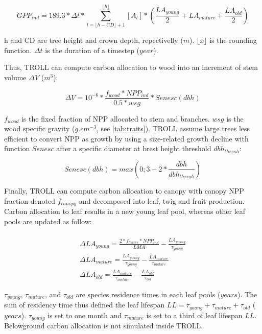 \documentclass[12pt,]{article}
\theoremstyle{definition}
\theoremstyle{definition}
\theoremstyle{remark}
\begin{document}
\begin{equation}
  GPP_{ind} = 189.3 * \Delta t * \sum _{l= \lfloor h-CD \rfloor +1} ^{\lfloor h \rfloor} [A_l] * (\frac{LA_{young}}{2} + LA_{mature} + \frac{LA_{old}}{2})
  \label{eq:GPP}
\end{equation}

h and CD are tree height and crown depth, repectivelly (\(m\)).
\(\lfloor x \rfloor\) is the rounding function. \(\Delta t\) is the
duration of a timestep (\(year\)).

Thus, TROLL can compute carbon allocation to wood into an increment of
stem volume \(\Delta V\) (\(m^3\)):

\begin{equation}
  \Delta V = 10^{-6} * \frac{f_{wood}*NPP_{ind}}{0.5*wsg}*Senesc(dbh)
  \label{eq:DeltaV}
\end{equation}

\(f_{wood}\) is the fixed fraction of NPP allocated to stem and
branches. \(wsg\) is the wood specific gravity (\(g.cm^{-3}\), see
\ref{tab:traits}). TROLL assume large trees less efficient to convert
NPP as growth by using a size-related growth decline with function
\(Senesc\) after a specific diameter at brest height threshold
\(dbh_{thresh}\):

\begin{equation}
  Senesc(dbh) = max(0;3-2*\frac{dbh}{dbh_{thresh}})
  \label{eq:Senesc}
\end{equation}

Finally, TROLL can compute carbon allocation to canopy with canopy NPP
fraction denoted \(f_{canopy}\) and decomposed into leaf, twig and fruit
production. Carbon allocation to leaf results in a new young leaf pool,
whereas other leaf pools are updated as follow:

\begin{equation}
  \begin{array}{c} \\
   \Delta LA_{young} = \frac{2*f_{leaves}*NPP_{ind}}{LMA}-\frac{LA_{young}}{\tau_{young}} \\
  \Delta LA_{mature} = \frac{LA_{young}}{\tau_{young}} - \frac{LA_{mature}}{\tau_{mature}}\\
  \Delta LA_{old} = \frac{LA_{mature}}{\tau_{mature}} - \frac{LA_{old}}{\tau_{old}}
  \end{array}
  \label{eq:DeltaLA}
\end{equation}

\(\tau_{young}\), \(\tau_{mature}\), and \(\tau_{old}\) are species
residence times in each leaf pools (\(years\)). The sum of residency
time thus defined the leaf lifespan
\(LL = \tau_{young} + \tau_{mature} + \tau_{old}\) (\(years\)).
\(\tau_{young}\) is set to one month and \(\tau_{mature}\) is set to a
third of leaf lifespan \(LL\). Belowground carbon allocation is not
simulated inside TROLL.
\end{document}
